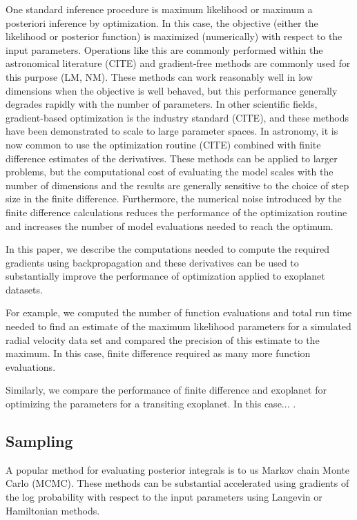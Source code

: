 \documentclass[modern]{aastex62}
\begin{document}
One standard inference procedure is maximum likelihood or maximum a posteriori inference by optimization.
In this case, the objective (either the likelihood or posterior function) is maximized (numerically) with respect to the input parameters.
Operations like this are commonly performed within the astronomical literature (CITE) and gradient-free methods are commonly used for this purpose (LM, NM).
These methods can work reasonably well in low dimensions when the objective is well behaved, but this performance generally degrades rapidly with the number of parameters.
In other scientific fields, gradient-based optimization is the industry standard (CITE), and these methods have been demonstrated to scale to large parameter spaces.
In astronomy, it is now common to use the  optimization routine (CITE) combined with finite difference estimates of the derivatives.
These methods can be applied to larger problems, but the computational cost of evaluating the model scales with the number of dimensions and the results are generally sensitive to the choice of step size in the finite difference.
Furthermore, the numerical noise introduced by the finite difference calculations reduces the performance of the optimization routine and increases the number of model evaluations needed to reach the optimum.

In this paper, we describe the computations needed to compute the required gradients using backpropagation and these derivatives can be used to substantially improve the performance of optimization applied to exoplanet datasets.


For example, we computed the number of function evaluations and total run time needed to find an estimate of the maximum likelihood parameters for a simulated radial velocity data set and compared the precision of this estimate to the  maximum.
In this case, finite difference required  as many more function evaluations.

Similarly, we compare the performance of finite difference and exoplanet for optimizing the parameters for a transiting exoplanet.
In this case... .

\subsection{Sampling}

A popular method for evaluating posterior integrals is to us Markov chain Monte Carlo (MCMC).
These methods can be substantial accelerated using gradients of the log probability with respect to the input parameters using Langevin or Hamiltonian methods.
\end{document}
